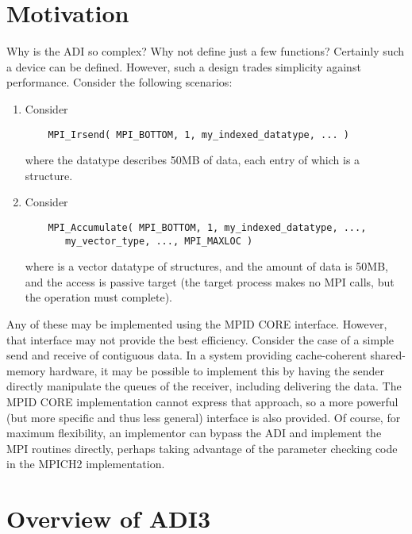 \documentclass[dvipdfm]{article}
\begin{document}


\section{Motivation}
\label{sec:motivation}

Why is the ADI so complex?  Why not define just a few functions?
Certainly such a device can be defined.  However, such a design trades
simplicity against performance.  
Consider the following scenarios:
\begin{enumerate}
\item Consider
\begin{verbatim}
    MPI_Irsend( MPI_BOTTOM, 1, my_indexed_datatype, ... )
\end{verbatim}
where the datatype describes 50MB of data, each entry of which is a
structure.
\item Consider
\begin{verbatim}
    MPI_Accumulate( MPI_BOTTOM, 1, my_indexed_datatype, ..., 
       my_vector_type, ..., MPI_MAXLOC )
\end{verbatim}
where  is
a vector datatype of structures, and the amount of data is 50MB, and
the access is passive target (the target process makes no MPI calls,
but the operation must complete).
\end{enumerate}

Any of these may be implemented using the MPID CORE interface.
However, that interface may not provide the best efficiency.  Consider
the case of a simple send and receive of contiguous data.  In a system
providing cache-coherent shared-memory hardware, it may be possible to
implement this by having the sender directly manipulate the queues of
the receiver, including delivering the data.  The MPID CORE
implementation cannot express that approach, so a more powerful (but
more specific and thus less general) interface is also provided.  Of
course, for maximum flexibility, an implementor can bypass the ADI and
implement the MPI routines directly, perhaps taking advantage of the
parameter checking code in the MPICH2 implementation.

\mancontentstrue

\section{Overview of ADI3}


\end{document}
